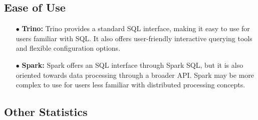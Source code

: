\subsection{Ease of Use}
\begin{enumerate}
\item[$\bullet$] \textbf{Trino:} Trino provides a standard SQL interface, making it easy to use for users familiar with SQL. It also offers user-friendly interactive querying tools and flexible configuration options.
\item[$\bullet$] \textbf{Spark:} Spark offers an SQL interface through Spark SQL, but it is also oriented towards data processing through a broader API. Spark may be more complex to use for users less familiar with distributed processing concepts.
\end{enumerate}

\subsection{Other Statistics}

